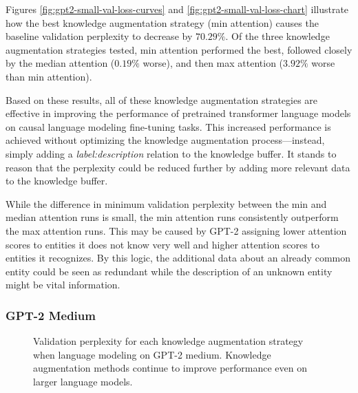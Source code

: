 \documentclass[phd,electronic,oneside,twosidetoc,letterpaper,chaptercenter,parttop,lof]{byumsphd}
\begin{document}
Figures \ref{fig:gpt2-small-val-loss-curves} and \ref{fig:gpt2-small-val-loss-chart} illustrate how the best knowledge augmentation strategy (min attention) causes the baseline validation perplexity to decrease by $70.29\%$.
Of the three knowledge augmentation strategies tested, min attention performed the best, followed closely by the median attention ($0.19\%$ worse), and then max attention ($3.92\%$ worse than min attention).

Based on these results, all of these knowledge augmentation strategies are effective in improving the performance of pretrained transformer language models on causal language modeling fine-tuning tasks.
This increased performance is achieved without optimizing the knowledge augmentation process---instead, simply adding a \emph{label:description}  relation to the knowledge buffer.
It stands to reason that the perplexity could be reduced further by adding more relevant data to the knowledge buffer.

While the difference in minimum validation perplexity between the min and median attention runs is small, the min attention runs consistently outperform the max attention runs.
This may be caused by GPT-2 assigning lower attention scores to entities it does not know very well and higher attention scores to entities it recognizes.
By this logic, the additional data about an already common entity could be seen as redundant while the description of an unknown entity might be vital information.

\subsubsection{GPT-2 Medium}

\begin{figure}
\centering
{}  
    \caption[GPT-2 medium validation loss chart]{
        Validation perplexity for each knowledge augmentation strategy when language modeling on GPT-2 medium.
        Knowledge augmentation methods continue to improve performance even on larger language models.
    }
    \label{fig:gpt2-med-val-loss-chart}
\end{figure}
\end{document}
